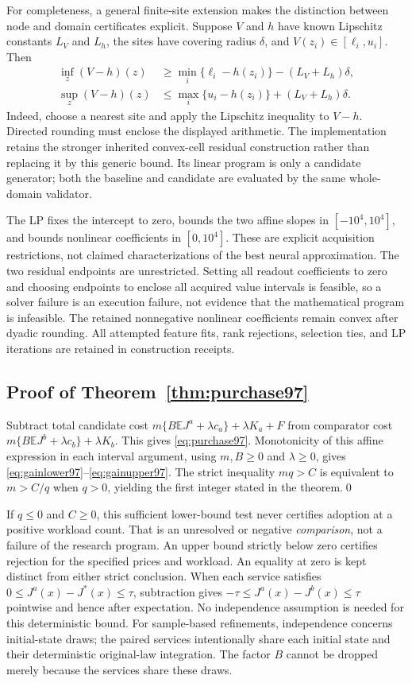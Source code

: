 For completeness, a general finite-site extension makes the distinction between node and domain certificates explicit. Suppose $V$ and $h$ have known Lipschitz constants $L_V$ and $L_h$, the sites have covering radius $\delta$, and $V(z_i)\in[\ell_i,u_i]$. Then
\begin{align*}
 \inf_z(V-h)(z)&\geq \min_i\{\ell_i-h(z_i)\}-(L_V+L_h)\delta,\\
 \sup_z(V-h)(z)&\leq \max_i\{u_i-h(z_i)\}+(L_V+L_h)\delta.
\end{align*}
Indeed, choose a nearest site and apply the Lipschitz inequality to $V-h$. Directed rounding must enclose the displayed arithmetic. The implementation retains the stronger inherited convex-cell residual construction rather than replacing it by this generic bound. Its linear program is only a candidate generator; both the baseline and candidate are evaluated by the same whole-domain validator.

The LP fixes the intercept to zero, bounds the two affine slopes in $[-10^4,10^4]$, and bounds nonlinear coefficients in $[0,10^4]$. These are explicit acquisition restrictions, not claimed characterizations of the best neural approximation. The two residual endpoints are unrestricted. Setting all readout coefficients to zero and choosing endpoints to enclose all acquired value intervals is feasible, so a solver failure is an execution failure, not evidence that the mathematical program is infeasible. The retained nonnegative nonlinear coefficients remain convex after dyadic rounding. All attempted feature fits, rank rejections, selection ties, and LP iterations are retained in construction receipts.

\subsection{Proof of Theorem~\ref{thm:purchase97}}
Subtract total candidate cost $m\{B\mathbb E J^a+\lambda c_a\}+\lambda K_a+F$ from comparator cost $m\{B\mathbb E J^b+\lambda c_b\}+\lambda K_b$. This gives \eqref{eq:purchase97}. Monotonicity of this affine expression in each interval argument, using $m,B\geq0$ and $\lambda\geq0$, gives \eqref{eq:gainlower97}--\eqref{eq:gainupper97}. The strict inequality $mq>C$ is equivalent to $m> C/q$ when $q>0$, yielding the first integer stated in the theorem.\qed

If $q\leq0$ and $C\geq0$, this sufficient lower-bound test never certifies adoption at a positive workload count. That is an unresolved or negative \emph{comparison}, not a failure of the research program. An upper bound strictly below zero certifies rejection for the specified prices and workload. An equality at zero is kept distinct from either strict conclusion. When each service satisfies $0\leq J^a(x)-J^*(x)\leq\tau$, subtraction gives $-\tau\leq J^a(x)-J^b(x)\leq\tau$ pointwise and hence after expectation. No independence assumption is needed for this deterministic bound. For sample-based refinements, independence concerns initial-state draws; the paired services intentionally share each initial state and their deterministic original-law integration. The factor $B$ cannot be dropped merely because the services share these draws.
